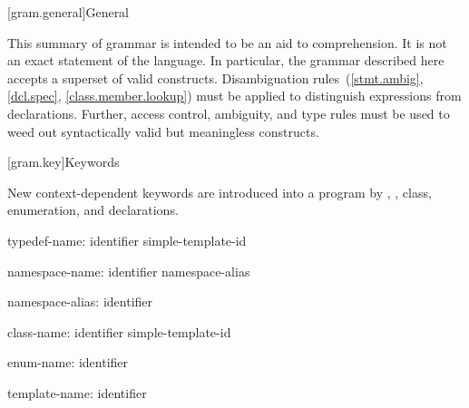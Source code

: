 
[gram.general]{General}

\pnum
{}%
%
This summary of \Cpp{} grammar is intended to be an aid to comprehension.
It is not an exact statement of the language.
In particular, the grammar described here accepts
a superset of valid \Cpp{} constructs.
Disambiguation rules~(\ref{stmt.ambig}, \ref{dcl.spec}, \ref{class.member.lookup})
must be applied to distinguish expressions from declarations.
Further, access control, ambiguity, and type rules must be used
to weed out syntactically valid but meaningless constructs.

[gram.key]{Keywords}

\pnum
{}%
New context-dependent keywords are introduced into a program by
,
,
class, enumeration, and
declarations.

\begin{ncbnf}
typedef-name:\br
	identifier\br
	simple-template-id
\end{ncbnf}

\begin{ncbnf}
namespace-name:\br
	identifier\br
	namespace-alias
\end{ncbnf}

\begin{ncbnf}
namespace-alias:\br
	identifier
\end{ncbnf}

\begin{ncbnf}
class-name:\br
	identifier\br
	simple-template-id
\end{ncbnf}

\begin{ncbnf}
enum-name:\br
	identifier
\end{ncbnf}

\begin{ncbnf}
template-name:\br
	identifier
\end{ncbnf}

\FlushAndPrintGrammar
